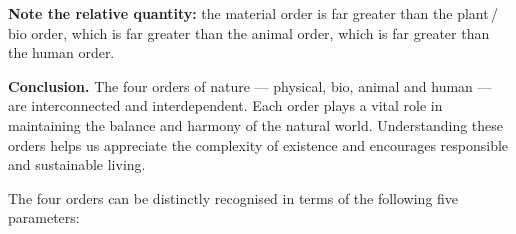 \begin{keybox}
\textbf{Note the relative quantity:} the material order is far greater than
the plant\,/\,bio order, which is far greater than the animal order, which is
far greater than the human order.
\end{keybox}

\textbf{Conclusion.} The four orders of nature --- physical, bio, animal and
human --- are interconnected and interdependent. Each order plays a vital role
in maintaining the balance and harmony of the natural world. Understanding
these orders helps us appreciate the complexity of existence and encourages
responsible and sustainable living.


\ans The four orders can be distinctly recognised in terms of the following
five parameters:

